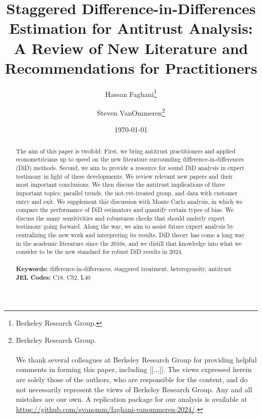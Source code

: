 \documentclass[12pt]{article}
\begin{document}
\begin{titlepage}
\title{Staggered Difference-in-Differences Estimation for Antitrust Analysis: A Review of New Literature and Recommendations for Practitioners}
\author{Hassan Faghani\thanks{Berkeley Research Group.} \and Steven VanOmmeren\thanks{
Berkeley Research Group. \\\\ We thank several colleagues at Berkeley Research Group for providing helpful comments in forming this paper, including [[...]]. The views expressed herein are solely those of the authors, who are responsible for the content, and do not necessarily represent the views of Berkeley Research Group. Any and all mistakes are our own. A replication package for our analysis is available at \url{https://github.com/svanomm/faghani-vanommeren-2024/}.
}
}

\date{\today}
\maketitle
\begin{abstract}
\noindent 
The aim of this paper is twofold: First, we bring antitrust practitioners and applied econometricians up to speed on the new literature surrounding difference-in-differences (DiD) methods. Second, we aim to provide a resource for sound DiD analysis in expert testimony in light of these developments. We review relevant new papers and their most important conclusions. We then discuss the antitrust implications of three important topics: parallel trends, the not-yet-treated group, and data with customer entry and exit. We supplement this discussion with Monte Carlo analysis, in which we compare the performance of DiD estimators and quantify certain types of bias. We discuss the many sensitivities and robustness checks that should underly expert testimony going forward. Along the way, we aim to assist future expert analysis by centralizing the new work and interpreting its results. DiD theory has come a long way in the academic literature since the 2010s, and we distill that knowledge into what we consider to be the new standard for robust DiD results in 2024.\\
\vspace{0in}\\
\noindent\textbf{Keywords:} difference-in-differences, staggered treatment, heterogeneity, antitrust
\vspace{0in}\\
\noindent\textbf{JEL Codes:} C18, C52, L40\\

\bigskip
\end{abstract}
\setcounter{page}{0}
\thispagestyle{empty}
\end{titlepage}
\pagebreak \newpage
\end{document}
